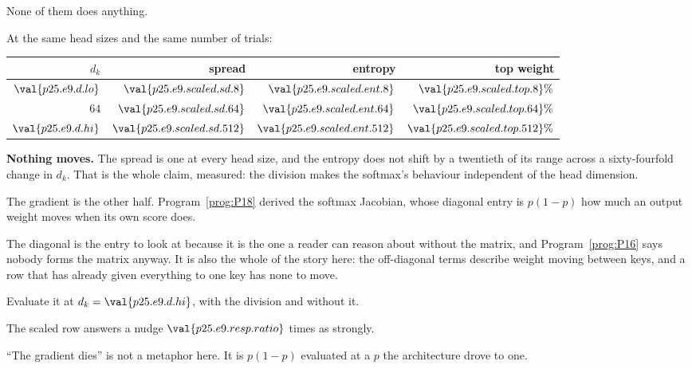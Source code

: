 \begin{fr}
\begin{ansblock}
None of them does anything.
\end{ansblock}

At the same head sizes and the same number of trials:

\begin{center}
\begin{tabular}{rrrr}
\toprule
$d_k$ & spread & entropy & top weight \\
\midrule
$\val{p25.e9.d.lo}$ & $\val{p25.e9.scaled.sd.8}$ &
  $\val{p25.e9.scaled.ent.8}$ & $\val{p25.e9.scaled.top.8}\%$ \\
$64$ & $\val{p25.e9.scaled.sd.64}$ & $\val{p25.e9.scaled.ent.64}$ &
  $\val{p25.e9.scaled.top.64}\%$ \\
$\val{p25.e9.d.hi}$ & $\val{p25.e9.scaled.sd.512}$ &
  $\val{p25.e9.scaled.ent.512}$ & $\val{p25.e9.scaled.top.512}\%$ \\
\bottomrule
\end{tabular}
\end{center}

\textbf{Nothing moves.} The spread is one at every head size, and the entropy
does not shift by a twentieth of its range across a sixty-fourfold change in
$d_k$. That is the whole claim, measured: the division makes the softmax's
behaviour independent of the head dimension.

The gradient is the other half. Program~\ref{prog:P18} derived the softmax
Jacobian, whose diagonal entry is $p(1-p)$ \dash{} how much an output weight
moves when its own score does.

The diagonal is the entry to look at because it is the one a reader can reason
about without the matrix, and Program~\ref{prog:P16} says nobody forms the
matrix anyway. It is also the whole of the story here: the off-diagonal terms
describe weight moving between keys, and a row that has already given
everything to one key has none to move.

Evaluate it at $d_k = \val{p25.e9.d.hi}$, with the division and without it.
\dotline
\nextframe
\end{fr}

\begin{fr}

The scaled row answers a nudge $\val{p25.e9.resp.ratio}$ times as strongly.

\enquote{The gradient dies} is not a metaphor here. It is
$p(1-p)$ evaluated at a $p$ the architecture drove to one.
\end{fr}

